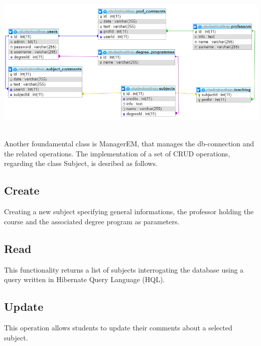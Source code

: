 \documentclass[a4paper, oneside]{article}
\begin{document}
\begin{minipage}{\linewidth}
\begin{center}
\vspace{1mm}
\includegraphics[width=155mm]{./images/diagrams/er_diagram2.png} 
\label{fig:diagramma_er2}
\end{center}
\end{minipage}
\vspace{5mm}\\
 Another foundamental class is ManagerEM, that manages the db-connection and the related operations.
 The implementation of a set of CRUD operations, regarding the class Subject, is desribed as follows.

\subsection{Create}
Creating a new subject specifying general informations, the professor holding the course and the associated degree program as parameters.\\
\vspace{2mm}

\vspace{5mm}

\subsection{Read}
This functionality returns a list of subjects interrogating the database using a query written in Hibernate Query Language (HQL).\\
\vspace{2mm}

\vspace{5mm}

\subsection{Update}
This operation allows students to update their comments about a selected subject.\\
\vspace{2mm}

\vspace{5mm}
\end{document}
